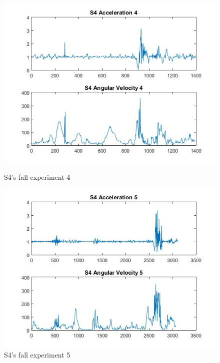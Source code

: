 \documentclass[letterpaper,12pt,titlepage,oneside,final]{book}
\begin{document}
\begin{figure}[h!]
	\centering
	\hspace{-1cm}
	\begin{minipage}[b]{0.5\textwidth}
		\centering
		\includegraphics[scale=0.42]{S4_4}
		\caption{S4's fall experiment 4}
	\end{minipage}%
	\hfill
	\begin{minipage}[b]{0.5\textwidth}
		\centering
		\includegraphics[scale=0.42]{S4_5}
		\caption{S4's fall experiment 5}
	\end{minipage}	
\end{figure}
\end{document}
